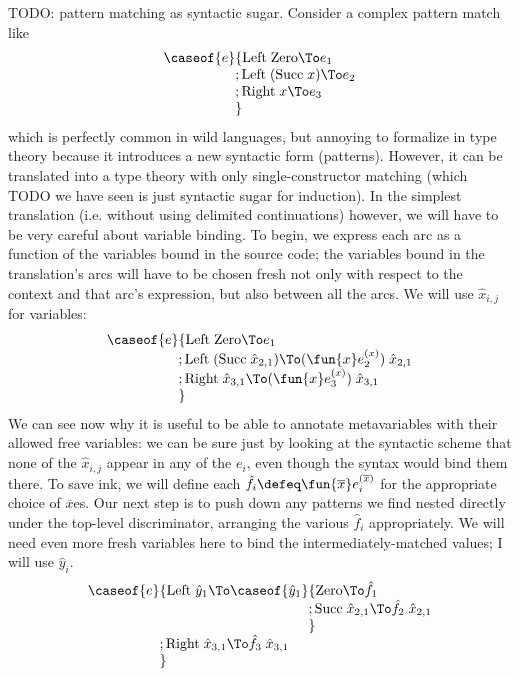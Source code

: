 \documentclass[11pt]{article} %
\theoremstyle{definition}
\theoremstyle{remark}
\begin{document}
TODO: pattern matching as syntactic sugar.
Consider a complex pattern match like
\[\begin{array}{l}
  \caseof{e} \{            \textrm{Left}\;\textrm{Zero} \To e_1 \\
    \hphantom{\caseof{e}\mathstrut}; \textrm{Left}\;(\textrm{Succ}\;x) \To e_2 \\
    \hphantom{\caseof{e}\mathstrut}; \textrm{Right}\;x \To e_3 \\
    \hphantom{\caseof{e}\mathstrut}\}
\end{array}\]
  which is perfectly common in wild languages, but annoying to formalize in type theory because it introduces a new syntactic form (patterns).
However, it can be translated into a type theory with only single-constructor matching (which TODO we have seen is just syntactic sugar for induction).
In the simplest translation (i.e. without using delimited continuations) however, we will have to be very careful about variable binding.
To begin, we express each arc as a function of the variables bound in the source code; the variables bound in the translation's arcs will have to be chosen fresh not only with respect to the context and that arc's expression, but also between all the arcs.
We will use $\hat x_{i,j}$ for variables:
\[\begin{array}{l}
  \caseof{e} \{            \textrm{Left}\;\textrm{Zero} \To e_1 \\
    \hphantom{\caseof{e}\mathstrut}; \textrm{Left}\;(\textrm{Succ}\;\hat x_{2,1}) \To (\fun{x}e_2^{(x)})\;\hat x_{2,1} \\
    \hphantom{\caseof{e}\mathstrut}; \textrm{Right}\;\hat x_{3,1} \To (\fun{x}e_3^{(x)})\;\hat x_{3,1} \\
    \hphantom{\caseof{e}\mathstrut}\}
\end{array}\]
We can see now why it is useful to be able to annotate metavariables with their allowed free variables: we can be sure just by looking at the syntactic scheme that none of the $\hat x_{i,j}$ appear in any of the $e_i$, even though the syntax would bind them there.
To save ink, we will define each $\hat f_i \defeq \fun{\overline{x}}e_i^{(\overline{x})}$ for the appropriate choice of $\overline{x}$es.
Our next step is to push down any patterns we find nested directly under the top-level discriminator, arranging the various $\hat f_i$ appropriately.
We will need even more fresh variables here to bind the intermediately-matched values; I will use $\hat y_i$.
\[\begin{array}{l}
  \caseof{e} \{            \textrm{Left}\;\hat y_1 \To
      \caseof{\hat y_1}\{                                                             \textrm{Zero} \To \hat f_1 \\
      \hphantom{\caseof{e}\{\textrm{Left}\;\hat y_1 \To \caseof{\hat y_1}\mathstrut}; \textrm{Succ}\;\hat x_{2,1} \To \hat f_2\;\hat x_{2,1} \\
      \hphantom{\caseof{e}\{\textrm{Left}\;\hat y_1 \To \caseof{\hat y_1}\mathstrut}\} \\
    \hphantom{\caseof{e}\mathstrut}; \textrm{Right}\;\hat x_{3,1} \To \hat f_3\;\hat x_{3,1} \\
    \hphantom{\caseof{e}\mathstrut}\}
\end{array}\]
\end{document}
